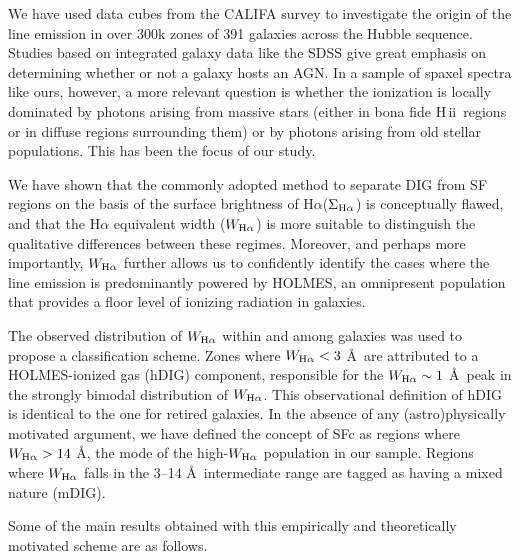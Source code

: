 \documentclass[a4paper, fleqn, usenatbib, useAMS]{mnras}
\newcommand{\Ha}{\ifmmode {\rm H}\alpha \else H$\alpha$\fi\xspace}
\newcommand{\hii}{H\,{\sc ii}\xspace}
\begin{document}
We have used data cubes from the CALIFA survey to investigate the origin of the line emission in over 300k zones of 391 galaxies across the Hubble sequence. Studies based on integrated galaxy data like the SDSS give great emphasis on determining whether or not a galaxy hosts an AGN. In a sample of spaxel spectra like ours, however, a more relevant question is whether the ionization is locally dominated by photons arising from massive stars (either in bona fide \hii\ regions or in diffuse regions surrounding them) or by photons arising from old stellar populations. This has been the focus of our study.

We have shown that the commonly adopted method to separate DIG from SF regions on the basis of the surface brightness of \Ha ($\Sigma_{\Ha}$) is conceptually flawed, and that the \Ha equivalent width ($W_{\Ha}$) is more suitable to distinguish the qualitative differences between these regimes. Moreover, and perhaps more importantly, $W_{\Ha}$ further allows us to confidently identify the cases where the line emission is predominantly powered by HOLMES, an omnipresent population that provides a floor level of ionizing radiation in galaxies.

The observed distribution of $W_{\Ha}$ within and among galaxies was used to propose a classification scheme. Zones where $W_{\Ha} < 3$ \AA\ are attributed to a HOLMES-ionized gas (hDIG) component, responsible for the $W_{\Ha} \sim 1$ \AA\ peak in the strongly bimodal distribution of $W_{\Ha}$. This observational definition of hDIG is identical to the one for retired galaxies. In the absence of any (astro)physically motivated argument, we have defined the concept of SFc as regions where $W_{\Ha} > 14$ \AA, the mode of the high-$W_{\Ha}$ population in our sample. Regions where $W_{\Ha}$ falls in the 3--14 \AA\ intermediate range are tagged as having a mixed nature (mDIG).

Some of the main results obtained with this empirically and theoretically motivated scheme are as follows.
\end{document}
